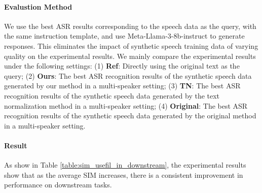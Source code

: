 \documentclass[11pt]{article}
\begin{document}
	\paragraph{Evalustion Method} We use the best ASR results corresponding to the speech data as the query, with the same instruction template, and use Meta-Llama-3-8b-instruct to generate responses. This eliminates the impact of synthetic speech training data of varying quality on the experimental results. We mainly compare the experimental results under the following settings: (1) \textbf{Ref}: Directly using the original text as the query; (2) \textbf{Ours}: The best ASR recognition results of the synthetic speech data generated by our method in a multi-speaker setting; (3) \textbf{TN}: The best ASR recognition results of the synthetic speech data generated by the text normalization method in a multi-speaker setting; (4) \textbf{Original}: The best ASR recognition results of the synthetic speech data generated by the original method in a multi-speaker setting.
	
	
	\begin{table}[tb]
		\centering
	\caption{The evaluation results of linguistic information from speech data obtained by different methods in generation tasks.}
	\label{table:sim_usefil_in_downstream}
	\end{table}
	
	\paragraph{Result} As show in Table \ref{table:sim_usefil_in_downstream}, the experimental results show that as the average SIM increases, there is a consistent improvement in performance on downstream tasks.
	
\end{document}
